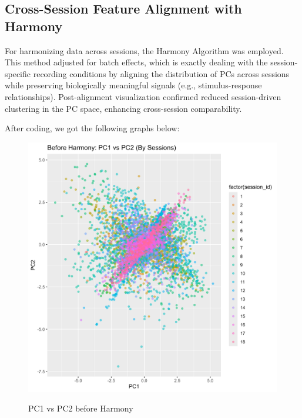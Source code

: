 \documentclass{article}
\begin{document}
	\subsection{Cross-Session Feature Alignment with Harmony}
	\par For harmonizing data across sessions, the Harmony Algorithm was employed. This method adjusted for batch effects, which is exactly dealing with the session-specific recording conditions by aligning the distribution of PCs across sessions while preserving biologically meaningful signals (e.g., stimulus-response relationships). Post-alignment visualization confirmed reduced session-driven clustering in the PC space, enhancing cross-session comparability.
	\par After coding, we got the following graphs below:
		\begin{figure}[htbp]
		\centering
		\begin{minipage}[t]{0.48\textwidth}
			\centering
			\includegraphics[scale=0.4]{Pics/15}\label{fig:1.17}
			\caption{PC1 vs PC2 before Harmony}
		\end{minipage}
		\begin{minipage}[t]{0.48\textwidth}
			\centering

\end{minipage}
\end{figure}
\end{document}
